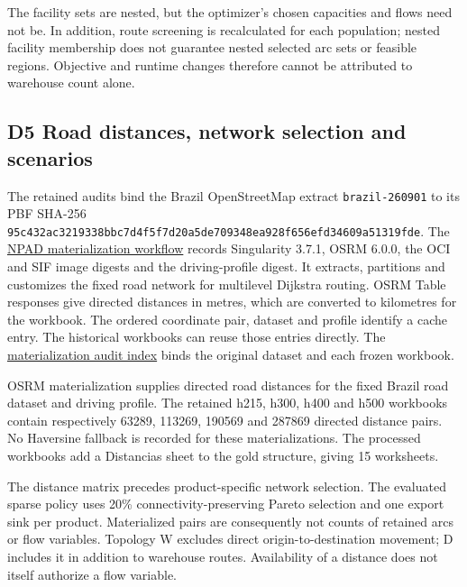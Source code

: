 \documentclass[
  english,
  11pt,
  a4paper,
]{article}
\begin{document}
The facility sets are nested, but the optimizer's chosen capacities and
flows need not be. In addition, route screening is recalculated for each
population; nested facility membership does not guarantee nested
selected arc sets or feasible regions. Objective and runtime changes
therefore cannot be attributed to warehouse count alone.

\subsection{D5 Road distances, network selection and
scenarios}\label{d5-road-distances-network-selection-and-scenarios}

The retained audits bind the Brazil OpenStreetMap extract
\texttt{brazil-260901} to its PBF SHA-256
\texttt{95c432ac3219338bbc7d4f5f7d20a5de709348ea928f656efd34609a51319fde}.
The
\href{https://github.com/unb-lamfo-or-ai-hpc/model-agrologistic/blob/965ca52777a5899163af72c9630e591b82c61de8/scripts/materialize_policy_osrm_population.slurm}{NPAD
materialization workflow} records Singularity 3.7.1, OSRM 6.0.0, the OCI
and SIF image digests and the driving-profile digest. It extracts,
partitions and customizes the fixed road network for multilevel Dijkstra
routing. OSRM Table responses give directed distances in metres, which
are converted to kilometres for the workbook. The ordered coordinate
pair, dataset and profile identify a cache entry. The historical
workbooks can reuse those entries directly. The
\href{https://github.com/unb-lamfo-or-ai-hpc/model-agrologistic/blob/965ca52777a5899163af72c9630e591b82c61de8/docs/evidence/osrm_release_preparation_20261101.json}{materialization
audit index} binds the original dataset and each frozen workbook.

OSRM materialization supplies directed road distances for the fixed
Brazil road dataset and driving profile. The retained h215, h300, h400
and h500 workbooks contain respectively 63289, 113269, 190569 and 287869
directed distance pairs. No Haversine fallback is recorded for these
materializations. The processed workbooks add a Distancias sheet to the
gold structure, giving 15 worksheets.

The distance matrix precedes product-specific network selection. The
evaluated sparse policy uses 20\% connectivity-preserving Pareto
selection and one export sink per product. Materialized pairs are
consequently not counts of retained arcs or flow variables. Topology W
excludes direct origin-to-destination movement; D includes it in
addition to warehouse routes. Availability of a distance does not itself
authorize a flow variable.
\end{document}
